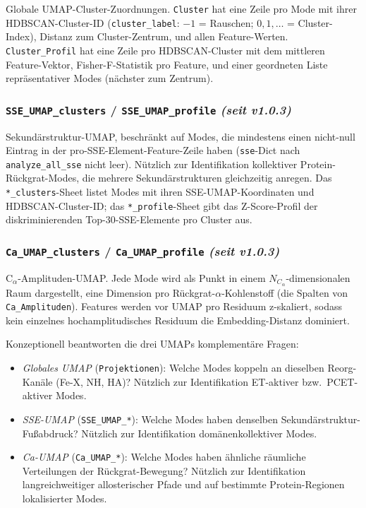 \documentclass[11pt,a4paper,twoside]{article}
\theoremstyle{remark}
\begin{document}
Globale UMAP-Cluster-Zuordnungen. \texttt{Cluster} hat eine Zeile pro
Mode mit ihrer HDBSCAN-Cluster-ID (\texttt{cluster\_label}: $-1$ =
Rauschen; $0, 1, \ldots$ = Cluster-Index), Distanz zum
Cluster-Zentrum, und allen Feature-Werten.
\texttt{Cluster\_Profil} hat eine Zeile pro HDBSCAN-Cluster mit dem
mittleren Feature-Vektor, Fisher-F-Statistik pro Feature, und einer
geordneten Liste repr\"asentativer Modes (n\"achster zum Zentrum).

\subsubsection*{\texttt{SSE\_UMAP\_clusters} / \texttt{SSE\_UMAP\_profile}
                  \emph{(seit v1.0.3)}}
\label{app:wb-embed-ssumap}

Sekund\"arstruktur-UMAP, beschr\"ankt auf Modes, die mindestens einen
nicht-null Eintrag in der pro-SSE-Element-Feature-Zeile haben
(\texttt{sse}-Dict nach \texttt{analyze\_all\_sse} nicht leer).
N\"utzlich zur Identifikation kollektiver
Protein-R\"uckgrat-Modes, die mehrere Sekund\"arstrukturen
gleichzeitig anregen. Das \texttt{*\_clusters}-Sheet listet Modes mit
ihren SSE-UMAP-Koordinaten und HDBSCAN-Cluster-ID; das
\texttt{*\_profile}-Sheet gibt das Z-Score-Profil der
diskriminierenden Top-30-SSE-Elemente pro Cluster aus.

\subsubsection*{\texttt{Ca\_UMAP\_clusters} / \texttt{Ca\_UMAP\_profile}
                  \emph{(seit v1.0.3)}}
\label{app:wb-embed-caumap}

C$_\alpha$-Amplituden-UMAP. Jede Mode wird als Punkt in einem
$N_{C_\alpha}$-dimensionalen Raum dargestellt, eine Dimension pro
R\"uckgrat-$\alpha$-Kohlenstoff (die Spalten von
\texttt{Ca\_Amplituden}). Features werden vor UMAP pro Residuum
z-skaliert, sodass kein einzelnes hochamplitudisches Residuum die
Embedding-Distanz dominiert.

Konzeptionell beantworten die drei UMAPs komplement\"are Fragen:
\begin{itemize}\setlength{\itemsep}{0pt}
  \item \emph{Globales UMAP} (\texttt{Projektionen}): Welche Modes
        koppeln an dieselben Reorg-Kan\"ale (Fe-X, NH, HA)?
        N\"utzlich zur Identifikation ET-aktiver bzw.\
        PCET-aktiver Modes.
  \item \emph{SSE-UMAP} (\texttt{SSE\_UMAP\_*}): Welche Modes haben
        denselben Sekund\"arstruktur-Fu\ss abdruck? N\"utzlich zur
        Identifikation dom\"anenkollektiver Modes.
  \item \emph{Ca-UMAP} (\texttt{Ca\_UMAP\_*}): Welche Modes haben
        \"ahnliche r\"aumliche Verteilungen der R\"uckgrat-Bewegung?
        N\"utzlich zur Identifikation langreichweitiger
        allosterischer Pfade und auf bestimmte Protein-Regionen
        lokalisierter Modes.
\end{itemize}
\end{document}
